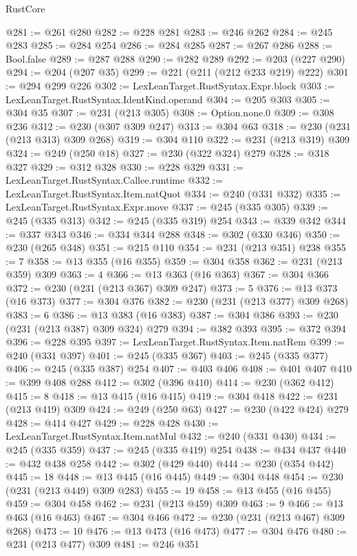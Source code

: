 \begin{lexlean}{RustCore}
\begin{coremodule}
@281 := @261 @280
@282 := @228 @281
@283 := @246 @262
@284 := @245 @283
@285 := @284 @254
@286 := @284 @285
@287 := @267 @286
@288 := Bool.false
@289 := @287 @288
@290 := @282 @289
@292 := @203 (@227 @290)
@294 := @204 (@207 @35)
@299 := @221 (@211 (@212 @233 @219) @222)
@301 := @294 @299 @226
@302 := LexLeanTarget.RustSyntax.Expr.block
@303 := LexLeanTarget.RustSyntax.IdentKind.operand
@304 := @205 @303
@305 := @304 @35
@307 := @231 (@213 @305)
@308 := Option.none.{0}
@309 := @308 @236
@312 := @230 (@307 @309 @247)
@313 := @304 @63
@318 := @230 (@231 (@213 @313) @309 @268)
@319 := @304 @110
@322 := @231 (@213 @319) @309
@324 := @249 (@250 @18)
@327 := @230 (@322 @324) @279
@328 := @318 @327
@329 := @312 @328
@330 := @228 @329
@331 := LexLeanTarget.RustSyntax.Callee.runtime
@332 := LexLeanTarget.RustSyntax.Item.natQuot
@334 := @240 (@331 @332)
@335 := LexLeanTarget.RustSyntax.Expr.move
@337 := @245 (@335 @305)
@339 := @245 (@335 @313)
@342 := @245 (@335 @319) @254
@343 := @339 @342
@344 := @337 @343
@346 := @334 @344 @288
@348 := @302 (@330 @346)
@350 := @230 (@265 @348)
@351 := @215 @110
@354 := @231 (@213 @351) @238
@355 := 7
@358 := @13 @355 (@16 @355)
@359 := @304 @358
@362 := @231 (@213 @359) @309
@363 := 4
@366 := @13 @363 (@16 @363)
@367 := @304 @366
@372 := @230 (@231 (@213 @367) @309 @247)
@373 := 5
@376 := @13 @373 (@16 @373)
@377 := @304 @376
@382 := @230 (@231 (@213 @377) @309 @268)
@383 := 6
@386 := @13 @383 (@16 @383)
@387 := @304 @386
@393 := @230 (@231 (@213 @387) @309 @324) @279
@394 := @382 @393
@395 := @372 @394
@396 := @228 @395
@397 := LexLeanTarget.RustSyntax.Item.natRem
@399 := @240 (@331 @397)
@401 := @245 (@335 @367)
@403 := @245 (@335 @377)
@406 := @245 (@335 @387) @254
@407 := @403 @406
@408 := @401 @407
@410 := @399 @408 @288
@412 := @302 (@396 @410)
@414 := @230 (@362 @412)
@415 := 8
@418 := @13 @415 (@16 @415)
@419 := @304 @418
@422 := @231 (@213 @419) @309
@424 := @249 (@250 @63)
@427 := @230 (@422 @424) @279
@428 := @414 @427
@429 := @228 @428
@430 := LexLeanTarget.RustSyntax.Item.natMul
@432 := @240 (@331 @430)
@434 := @245 (@335 @359)
@437 := @245 (@335 @419) @254
@438 := @434 @437
@440 := @432 @438 @258
@442 := @302 (@429 @440)
@444 := @230 (@354 @442)
@445 := 18
@448 := @13 @445 (@16 @445)
@449 := @304 @448
@454 := @230 (@231 (@213 @449) @309 @283)
@455 := 19
@458 := @13 @455 (@16 @455)
@459 := @304 @458
@462 := @231 (@213 @459) @309
@463 := 9
@466 := @13 @463 (@16 @463)
@467 := @304 @466
@472 := @230 (@231 (@213 @467) @309 @268)
@473 := 10
@476 := @13 @473 (@16 @473)
@477 := @304 @476
@480 := @231 (@213 @477) @309
@481 := @246 @351

\end{coremodule}
\end{lexlean}
